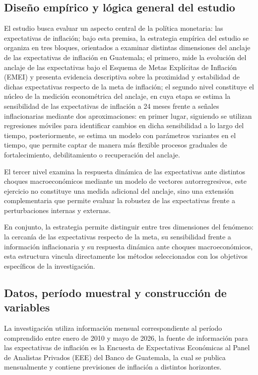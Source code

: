 \documentclass[
  10.5pt,
  letterpaper,
  twocolumn]{article}
\begin{document}
\subsection{Diseño empírico y lógica general del
estudio}\label{diseuxf1o-empuxedrico-y-luxf3gica-general-del-estudio}

El estudio busca evaluar un aspecto central de la política monetaria:
las expectativas de inflación; bajo esta premisa, la estrategia empírica
del estudio se organiza en tres bloques, orientados a examinar distintas
dimensiones del anclaje de las expectativas de inflación en Guatemala;
el primero, mide la evolución del anclaje de las expectativas bajo el
Esquema de Metas Explícitas de Inflación (EMEI) y presenta evidencia
descriptiva sobre la proximidad y estabilidad de dichas expectativas
respecto de la meta de inflación; el segundo nivel constituye el núcleo
de la medición econométrica del anclaje, en cuya etapa se estima la
sensibilidad de las expectativas de inflación a 24 meses frente a
señales inflacionarias mediante dos aproximaciones: en primer lugar,
siguiendo se utilizan regresiones móviles para identificar cambios en
dicha sensibilidad a lo largo del tiempo, posteriormente, se estima un
modelo con parámetros variantes en el tiempo, que permite captar de
manera más flexible procesos graduales de fortalecimiento,
debilitamiento o recuperación del anclaje.

El tercer nivel examina la respuesta dinámica de las expectativas ante
distintos choques macroeconómicos mediante un modelo de vectores
autorregresivos, este ejercicio no constituye una medida adicional del
anclaje, sino una extensión complementaria que permite evaluar la
robustez de las expectativas frente a perturbaciones internas y
externas.

En conjunto, la estrategia permite distinguir entre tres dimensiones del
fenómeno: la cercanía de las expectativas respecto de la meta, su
sensibilidad frente a información inflacionaria y su respuesta dinámica
ante choques macroeconómicos, esta estructura vincula directamente los
métodos seleccionados con los objetivos específicos de la investigación.

\subsection{Datos, período muestral y construcción de
variables}\label{datos-peruxedodo-muestral-y-construcciuxf3n-de-variables}

La investigación utiliza información mensual correspondiente al período
comprendido entre enero de 2010 y mayo de 2026, la fuente de información
para las expectativas de inflación es la Encuesta de Expectativas
Económicas al Panel de Analistas Privados (EEE) del Banco de Guatemala,
la cual se publica mensualmente y contiene previsiones de inflación a
distintos horizontes.
\end{document}
